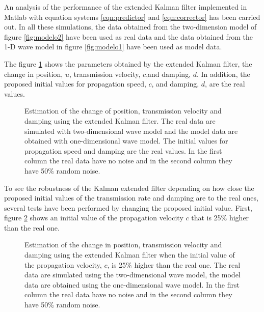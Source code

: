 \documentclass[12pt, a4paper]{article} %
\begin{document}
\setlength{\parskip}{0mm}

An analysis of the performance of the extended Kalman filter implemented in Matlab with equation systems \ref{eqn:predictor} and \ref{eqn:corrector} has been carried out. In all these simulations, the data obtained from the two-dimension model of figure \ref{fig:modelo2} have been used as real data and the data obtained from the 1-D wave model in figure \ref{fig:modelo1} have been used as model data.

\setlength{\parskip}{4mm}

The figure \ref{fig:kalman1} shows the parameters obtained by the extended Kalman filter, the change in position, $u$, transmission velocity, $c$,and damping, $d$. In addition, the proposed initial values for propagation speed, $c$, and damping, $d$, are the real values.

\begin{figure}[h!]
    \centering
    
    \caption{Estimation of the change of position, transmission velocity and damping using the extended Kalman filter. The real data are simulated with two-dimensional wave model and the model data are obtained with one-dimensional wave model. The initial values for propagation speed and damping are the real values. In the first column the real data have no noise and in the second column they have 50\% random noise.}
    \label{fig:kalman1}
\end{figure}

To see the robustness of the Kalman extended filter depending on how close the proposed initial values of the transmission rate and damping are to the real ones, several tests have been performed by changing the proposed initial value.  
First, figure \ref{fig:kalman1c} shows an initial value of the propagation velocity $c$ that is 25\% higher than the real one.

\begin{figure}[h!]
    \centering
    
    \caption{Estimation of the change in position, transmission velocity and damping using the extended Kalman filter when the initial value of the propagation velocity, $c$, is 25\% higher than the real one. The real data are simulated using the two-dimensional wave model, the model data are obtained using the one-dimensional wave model. In the first column the real data have no noise and in the second column they have 50\% random noise.}
    \label{fig:kalman1c}
\end{figure}
\end{document}
